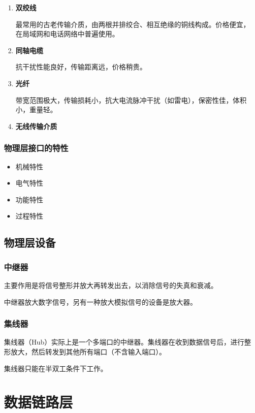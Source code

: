 \documentclass[12pt, a4paper, oneside]{ctexart}
\begin{document}
\begin{enumerate}
    \item {\bf 双绞线}
    
    最常用的古老传输介质，由两根并排绞合、相互绝缘的铜线构成。价格便宜，在局域网和电话网络中普遍使用。
    \item {\bf 同轴电缆}
    
    抗干扰性能良好，传输距离远，价格稍贵。
    \item {\bf 光纤}
    
    带宽范围极大，传输损耗小，抗大电流脉冲干扰（如雷电），保密性佳，体积小，重量轻。
    \item {\bf 无线传输介质}
\end{enumerate}

\subsubsection{物理层接口的特性}

\begin{itemize}
    \item 机械特性
    \item 电气特性
    \item 功能特性
    \item 过程特性
\end{itemize}

\subsection{物理层设备}

\subsubsection{中继器}

主要作用是将信号整形并放大再转发出去，以消除信号的失真和衰减。

中继器放大数字信号，另有一种放大模拟信号的设备是放大器。

\subsubsection{集线器}

集线器（Hub）实际上是一个多端口的中继器。集线器在收到数据信号后，进行整形放大，然后转发到其他所有端口（不含输入端口）。

集线器只能在半双工条件下工作。

\section{数据链路层}
\end{document}
